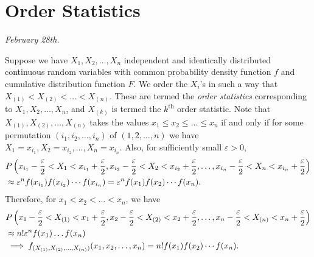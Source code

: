 \documentclass[15pt,a4paper]{book}
\theoremstyle{definition}
\newcommand{\eax}[1]{\emph{#1}\index{#1}} %
\begin{document}
\section{Order Statistics}
\textit{February 28th.}

Suppose we have $X_{1},X_{2},\ldots,X_{n}$ independent and identically distributed continuous random variables with common probability density function $f$ and cumulative distribution function $F$. We order the $X_{i}$'s in such a way that $X_{(1)}<X_{(2)}<\ldots<X_{(n)}$. These are termed the \eax{order statistics} corresponding to $X_{1},X_{2},\ldots,X_{n}$, and $X_{(k)}$ is termed the $k^{\text{th}}$ order statistic. Note that $X_{(1)},X_{(2)},\ldots,X_{(n)}$ takes the values $x_{1}\leq x_{2} \leq \ldots \leq x_{n}$ if and only if for some permutation $(i_{1},i_{2},\ldots,i_{n})$ of $(1,2,\ldots,n)$ we have $X_{1} = x_{i_{1}},X_{2}=x_{i_{2}},\ldots,X_{n}=x_{i_{n}}$. Also, for sufficiently small $\varepsilon > 0$,
\begin{align}
    & P\left(x_{i_{1}}-\frac{\varepsilon}{2} < X_{1} < x_{i_{1}} + \frac{\varepsilon}{2}, x_{i_{2}} - \frac{\varepsilon}{2} < X_{2} < x_{i_{2}} + \frac{\varepsilon}{2}, \ldots, x_{i_{n}} - \frac{\varepsilon}{2} < X_{n} < x_{i_{n}} + \frac{\varepsilon}{2}\right) \notag \\
    &\approx \varepsilon^{n} f(x_{i_{1}}) f(x_{i_{2}}) \cdots f(x_{i_{n}}) = \varepsilon^{n} f(x_{1}) f(x_{2}) \cdots f(x_{n}).
\end{align}
Therefore, for $x_{1} < x_{2} < \ldots < x_{n}$, we have
\begin{align}
    & P\left(x_{1}-\frac{\varepsilon}{2} < X_{(1)} < x_{1} + \frac{\varepsilon}{2}, x_{2} - \frac{\varepsilon}{2} < X_{(2)} < x_{2} + \frac{\varepsilon}{2}, \ldots, x_{n} - \frac{\varepsilon}{2} < X_{(n)} < x_{n} + \frac{\varepsilon}{2}\right) \notag \\
    &\approx n! \varepsilon^{n} f(x_{1}) \ldots f(x_{n}) \\
    &\implies f_{(X_{(1)},X_{(2)},\ldots,X_{(n)})}(x_{1},x_{2},\ldots,x_{n}) = n! f(x_{1})f(x_{2}) \cdots f(x_{n}).
\end{align}
\end{document}
